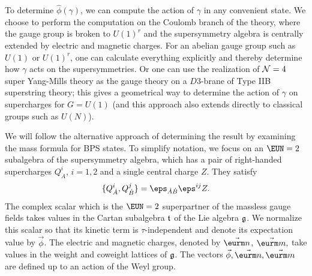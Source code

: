 To determine $\hat\phi(\gamma)$, we can compute the action of
$\gamma$ in any convenient state. We choose to perform the
computation on the Coulomb branch of the theory, where the gauge
group is broken to $U(1)^r$ and the supersymmetry algebra is
centrally extended by electric and magnetic charges.  For an
abelian gauge group such as $U(1)$ or $U(1)^r$, one can calculate
everything explicitly and thereby determine how $\gamma$ acts on
the supersymmetries.  Or one can use the realization of ${\cal
N}=4$ super Yang-Mills theory as the gauge theory on a $D3$-brane
of Type IIB superstring theory; this gives a geometrical way to
determine the action of $\gamma$ on supercharges for $G=U(1)$ (and
this approach also extends directly to classical groups such as
$U(N)$).

We will follow the alternative approach of determining the result
by examining the mass formula for BPS states. To simplify
notation, we focus on an ${\EUN}=2$ subalgebra of the
supersymmetry algebra, which has a pair of right-handed
supercharges $Q_{\dot A}^i$, $i=1,2$ and a single central charge
$Z$. They satisfy %
\setcounter{equation}{17}
\begin{equation}\label{eq:hilj}
\{Q_{\dot A}^i,Q_{\dot
B}^j\}=\eps_{\dot A\dot B}\eps^{ij} Z.
\end{equation}
 The complex scalar which
is the ${\EUN}=2$ superpartner of the massless gauge fields takes
values in the Cartan subalgebra ${\frak t}$ of the Lie algebra
${\frak g}$. We normalize this scalar so that its kinetic term is
$\tau$-independent and denote its expectation value by
$\vec{\phi}$.  The electric and magnetic charges, denoted by
$\vec{\eurm n}$, $\vec{\eurm m},$ take values in the weight and
coweight lattices of $\frak g$. The vectors $\vec{\phi},\vec{\eurm
n},\vec{\eurm m}$ are defined up to an action of the Weyl group.

